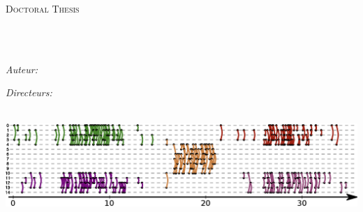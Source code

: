 




\frontmatter %

\pagestyle{plain} %


\begin{titlepage}
\begin{center}

{\scshape\LARGE \univname\par}\vspace{1.5cm} %
\textsc{\Large Doctoral Thesis}\\[0.5cm] %

\HRule \\[0.4cm] %
{\huge \bfseries \hspace*{-0.22cm} \ttitle\par}\vspace{0.4cm} %
\HRule \\[1.5cm] %
 
\begin{minipage}[t]{0.4\textwidth}
\begin{flushleft} \large
\emph{Auteur:}\\
\authorname %
\end{flushleft}
\end{minipage}
\begin{minipage}[t]{0.4\textwidth}
\begin{flushright} \large
\emph{Directeurs:} \\
\supname %
\end{flushright}
\end{minipage}\\[3cm]
\includegraphics[width=\linewidth]{img/Intro/Dessin_Flot.eps}
 

\end{center}
\end{titlepage}
